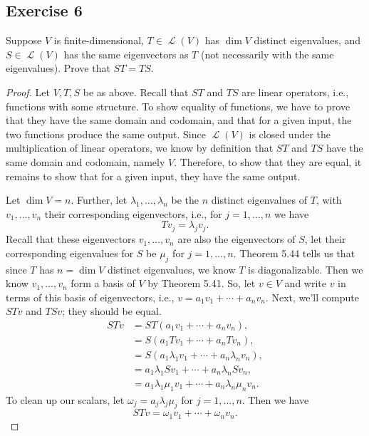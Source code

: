 \documentclass[letterpaper, 12pt]{amsart}
\DeclareMathOperator{\Ell}{\mathscr{L}}				%
\theoremstyle{definition}  							%
\begin{document}
		\subsection*{Exercise 6}
		Suppose $V$ is finite-dimensional, $T \in \Ell(V)$ has $\dim V$ distinct eigenvalues, and $S \in \Ell(V)$ has the same eigenvectors as $T$ (not necessarily with the same eigenvalues). 
		Prove that $ST = TS$.
		\vspace*{3mm}

		\begin{proof}
		Let $V,T,S$ be as above.
		Recall that $ST$ and $TS$ are linear operators, i.e., functions with some structure.
		To show equality of functions, we have to prove that they have the same domain and codomain, and that for a given input, the two functions produce the same output.
		Since $\Ell(V)$ is closed under the multiplication of linear operators, we know by definition that $ST$ and $TS$ have the same domain and codomain, namely $V$. Therefore, to show that they are equal, it remains to show that for a given input, they have the same output.

		Let $\dim V = n$.
		Further, let $\lambda_{1}, \dots, \lambda_{n}$ be the $n$ distinct eigenvalues of $T$, with $v_{1}, \dots, v_{n}$ their corresponding eigenvectors, i.e., for $j = 1,\dots,n$ we have $$Tv_{j} = \lambda_{j}v_{j}.$$
		Recall that these eigenvectors $v_{1}, \dots, v_{n}$ are also the eigenvectors of $S$, let their corresponding eigenvalues for $S$ be $\mu_{j}$ for $j=1,\dots,n$.
		Theorem 5.44 tells us that since $T$ has $n = \dim V$ distinct eigenvalues, we know $T$ is diagonalizable.
		Then we know $v_{1}, \dots, v_{n}$ form a basis of $V$ by Theorem 5.41. 
		So, let $v \in V$ and write $v$ in terms of this basis of eigenvectors, i.e., $v = a_{1}v_{1} + \cdots + a_{n}v_{n}$.
		Next, we'll compute $STv$ and $TSv$; they should be equal.
			\begin{align*}
				STv &= ST(a_{1}v_{1} + \cdots + a_{n}v_{n}), \\
				&= S ( a_{1}Tv_{1} + \cdots + a_{n}Tv_{n} ), \\
				&= S ( a_{1}\lambda_{1}v_{1} + \cdots + a_{n}\lambda_{n}v_{n} ), \\
				&= a_{1}\lambda_{1}Sv_{1} + \cdots + a_{n}\lambda_{n}Sv_{n}, \\
				&= a_{1}\lambda_{1}\mu_{1}v_{1} + \cdots + a_{n}\lambda_{n}\mu_{n}v_{n}.
			\end{align*}
		To clean up our scalars, let $\omega_{j} = a_{j}\lambda_{j}\mu_{j}$ for $j = 1,\dots,n$.
		Then we have $$STv = \omega_{1}v_{1} + \cdots + \omega_{n}v_{n}.$$


\end{proof}
\end{document}

